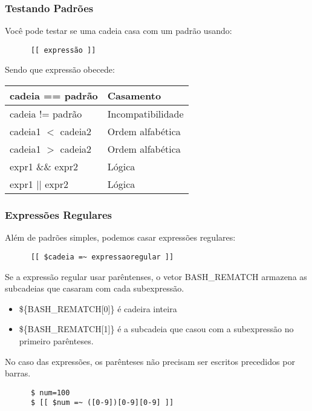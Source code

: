 \documentclass{beamer}
\begin{document}
   \begin{frame}[fragile]
      \frametitle{Testando Padrões}
      Você pode testar se uma cadeia casa com um padrão usando:
      \begin{verbatim}
      [[ expressão ]]
      \end{verbatim}
      Sendo que expressão obecede: \\ 
      \begin{table}
         \begin{tabular}{l|l}
	 \hline
         cadeia == padrão & Casamento \\
         \hline 
         cadeia != padrão & Incompatibilidade \\
         \hline 
         cadeia1 $<$ cadeia2 & Ordem alfabética \\
         \hline 
         cadeia1 $>$ cadeia2 & Ordem alfabética \\
         \hline 
         expr1 \&\& expr2 & Lógica \\
         \hline 
         expr1 $||$ expr2 & Lógica \\
         \hline 
         \end{tabular}
      \end{table}
\end{frame}
   
   \begin{frame}[fragile]
      \frametitle{Expressões Regulares}
      Além de padrões simples, podemos casar expressões regulares: \\
      \begin{verbatim}
      [[ $cadeia =~ expressaoregular ]]
      \end{verbatim}
      Se a expressão regular usar parêntenses, o vetor BASH\_REMATCH armazena as subcadeias que casaram com cada subexpressão. \\
      \begin{itemize}
         \item \$\{BASH\_REMATCH[0]\} é cadeira inteira
	 \item \$\{BASH\_REMATCH[1]\} é a subcadeia que casou com a subexpressão no primeiro parênteses.
      \end{itemize}
      No caso das expressões, os parênteses não precisam ser escritos precedidos por barras.
      \begin{verbatim}
      $ num=100
      $ [[ $num =~ ([0-9])[0-9][0-9] ]]
      \end{verbatim}
\end{frame}
\end{document}
